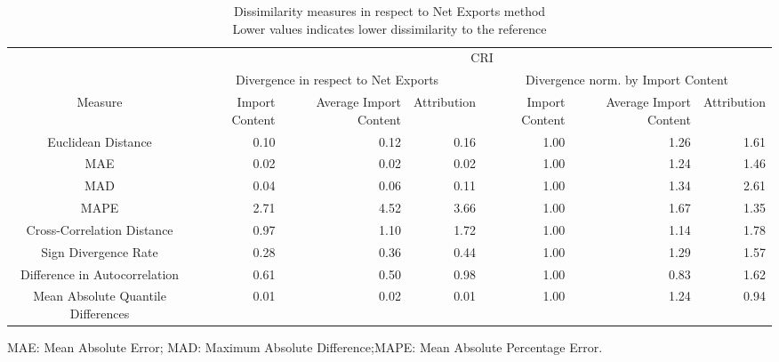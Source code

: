 \begin{table}[t]
\caption*{
{\large Dissimilarity measures in respect to Net Exports method} \\ 
{\small Lower values indicates lower dissimilarity to the reference}
} 
\fontsize{15.0pt}{18.0pt}\selectfont
\begin{tabular*}{\linewidth}{@{\extracolsep{\fill}}crrrrrr}
\toprule
 & \multicolumn{6}{c}{CRI} \\ 
\cmidrule(lr){2-7}
 & \multicolumn{3}{c}{Divergence in respect to Net Exports} & \multicolumn{3}{c}{Divergence norm. by Import Content} \\ 
\cmidrule(lr){2-4} \cmidrule(lr){5-7}
Measure & Import Content & Average Import Content & Attribution & Import Content & Average Import Content & Attribution \\ 
\midrule\addlinespace[2.5pt]
Euclidean Distance & 0.10 & 0.12 & 0.16 & 1.00 & 1.26 & 1.61 \\ 
MAE & 0.02 & 0.02 & 0.02 & 1.00 & 1.24 & 1.46 \\ 
MAD & 0.04 & 0.06 & 0.11 & 1.00 & 1.34 & 2.61 \\ 
MAPE & 2.71 & 4.52 & 3.66 & 1.00 & 1.67 & 1.35 \\ 
Cross-Correlation Distance & 0.97 & 1.10 & 1.72 & 1.00 & 1.14 & 1.78 \\ 
Sign Divergence Rate & 0.28 & 0.36 & 0.44 & 1.00 & 1.29 & 1.57 \\ 
Difference in Autocorrelation & 0.61 & 0.50 & 0.98 & 1.00 & 0.83 & 1.62 \\ 
Mean Absolute Quantile Differences & 0.01 & 0.02 & 0.01 & 1.00 & 1.24 & 0.94 \\ 
\bottomrule
\end{tabular*}
\begin{minipage}{\linewidth}
MAE: Mean Absolute Error; MAD: Maximum Absolute Difference;MAPE: Mean Absolute Percentage Error.\\
\end{minipage}
\end{table}

